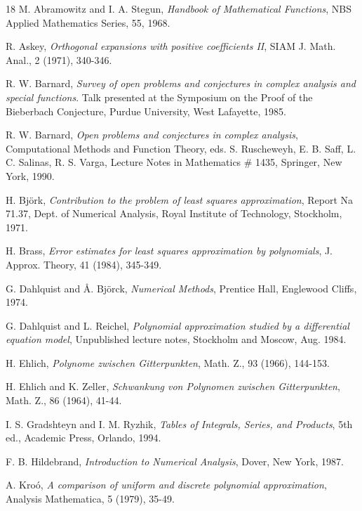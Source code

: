\newpage
\begin{thebibliography}{18}
{\sc M. Abramowitz and I. A. Stegun}, {\em Handbook of Mathematical
Functions}, NBS Applied Mathematics Series, 55, 1968.

{\sc R. Askey}, {\em Orthogonal expansions with positive coefficients II},
SIAM J. Math. Anal., 2 (1971), 340-346.

{\sc R. W. Barnard}, {\em Survey of open problems and conjectures in
complex analysis and special functions}. Talk presented at the
Symposium on the Proof of the Bieberbach Conjecture, Purdue
University, West Lafayette, 1985.

{\sc R. W. Barnard}, {\em Open problems and conjectures in complex
analysis}, Computational Methods and Function Theory, eds. S.
Ruscheweyh, E. B. Saff, L. C. Salinas, R. S. Varga, Lecture Notes in
Mathematics \# 1435, Springer, New York, 1990.

{\sc H. Bj\"{o}rk}, {\em Contribution to the problem of least squares
approximation}, Report Na 71.37, Dept. of Numerical Analysis, Royal
Institute of Technology, Stockholm, 1971.

{\sc H. Brass}, {\em Error estimates for least squares approximation
by polynomials}, J. Approx. Theory, 41 (1984), 345-349.

{\sc G. Dahlquist and \AA. Bj\"{o}rck}, {\em Numerical Methods}, Prentice Hall,
Englewood Cliffs, 1974.

{\sc G. Dahlquist and L. Reichel}, {\em Polynomial approximation studied by
a differential equation model}, Unpublished lecture notes, Stockholm and
Moscow, Aug. 1984.

{\sc H. Ehlich}, {\em Polynome zwischen Gitterpunkten}, Math. Z.,
93 (1966), 144-153.

{\sc H. Ehlich and K. Zeller}, {\em Schwankung von Polynomen zwischen
Gitterpunkten}, Math. Z., 86 (1964), 41-44.

 {\sc I. S. Gradshteyn and I. M. Ryzhik}, {\em Tables of
Integrals, Series, and Products}, 5th ed., Academic Press, Orlando,
1994.

 {\sc F. B. Hildebrand}, {\em Introduction to Numerical Analysis},
Dover, New York, 1987.

{\sc A. Kro\'{o}}, {\em A comparison of uniform and discrete polynomial
approximation}, Analysis Mathematica, 5 (1979), 35-49.


\end{thebibliography}
